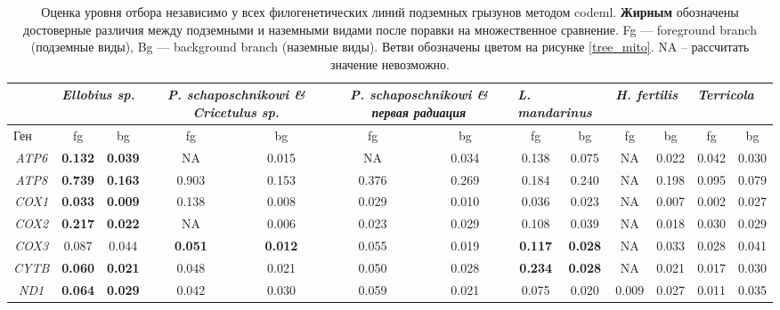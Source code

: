 \begin{landscape}
	
	\begin{table}[]
		\caption{Оценка уровня отбора независимо у всех филогенетических линий подземных грызунов методом codeml. \textbf{Жирным} обозначены достоверные различия между подземными и наземными видами после поравки на множественное сравнение. Fg --- foreground branch (подземные виды), Bg --- background branch (наземные виды). Ветви обозначены цветом на рисунке \ref{tree_mito}. NA -- рассчитать значение невозможно. }\label{MT_branch} \vspace{5mm}
		\large
		
		\begin{tabular}{|c|c|c|c|c|c|c|c|c|c|c|c|c|}
			\hline
			\multicolumn{1}{|l|}{}    & \multicolumn{2}{l|}{\textit{Ellobius sp.}} & \multicolumn{2}{p{5cm}|}{\textit{P. schaposchnikowi \& \textit{Cricetulus sp.}}} & \multicolumn{2}{p{5cm}|}{\textit{P. schaposchnikowi \& первая радиация}} & \multicolumn{2}{l|}{\textit{L. mandarinus}} & \multicolumn{2}{l|}{\textit{H. fertilis}} & \multicolumn{2}{l|}{\textit{Terricola}} \\ \hline
			\multicolumn{1}{|l|}{Ген} & fg & bg & fg & bg & fg & bg & fg & bg & fg & bg & fg & bg \\ \hline
			{\textit{ATP6}} & \textbf{0.132} & \textbf{0.039} & NA & 0.015 & NA & 0.034 & 0.138 & 0.075 & NA & 0.022 & 0.042 & 0.030 \\ \hline
			\textit{ATP8} & \textbf{0.739} & \textbf{0.163} & 0.903 & 0.153 & 0.376 & 0.269 & 0.184 & 0.240 & NA & 0.198 & 0.095& 0.079 \\ \hline
			\textit{COX1} & \textbf{0.033} & \textbf{0.009} & 0.138 & 0.008 & 0.029 & 0.010 & 0.036 & 0.023 & NA & 0.007 & 0.002& 0.027 \\ \hline
			\textit{COX2} & \textbf{0.217} & \textbf{0.022} & NA & 0.006 & 0.023 & 0.029 & 0.108 & 0.039 & NA & 0.018 & 0.030& 0.029 \\ \hline
			\textit{COX3} & 0.087 & 0.044 & \textbf{0.051} & \textbf{0.012} & 0.055 & 0.019 & \textbf{0.117} & \textbf{0.028} & NA & 0.033 & 0.028& 0.041 \\ \hline
			\textit{CYTB} & \textbf{0.060} & \textbf{0.021} & 0.048 & 0.021 & 0.050 & 0.028 & \textbf{0.234} & \textbf{0.028} & NA & 0.021 & 0.017& 0.030 \\ \hline
			\textit{ND1} & \textbf{0.064} & \textbf{0.029} & 0.042 & 0.030 & 0.059 & 0.021 & 0.075 & 0.020 & 0.009 & 0.027 & 0.011& 0.035 \\ \hline

\end{tabular}
\end{table}
\end{landscape}
